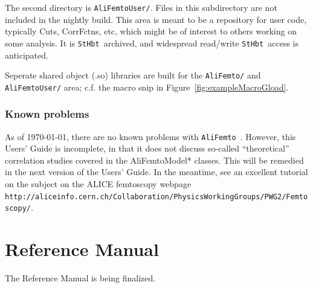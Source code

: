 \documentclass[twoside]{article}
\newcommand{\name}[1]{\textsf{#1}}%
\newcommand{\AliFemto}{{\tt AliFemto }}
\newcommand{\cvs}{{\tt StHbt }}
\begin{document}
The second directory is {\tt AliFemtoUser/}.  Files in this subdirectory are not included in the nightly
build.  This area is meant to be a repository for user code, typically Cuts, CorrFctns, etc, which might
be of interest to others working on some analysis.  It is \cvs archived, and widespread read/write \cvs access
is anticipated.

Seperate shared object (.so) libraries are built for the {\tt AliFemto/} and {\tt AliFemtoUser/}
area; c.f. the macro snip in Figure~\ref{fig:exampleMacroGload}.


\section{Known problems}

As of \today, there are no known problems with \AliFemto.  However, this Users' Guide is incomplete, in that
it does not discuss so-called ``theoretical'' correlation studies covered in the \name{AliFemtoModel*} classes.
This will be remedied in the next version of the Users' Guide.  In the meantime, see an excellent tutorial
on the subject on the ALICE femtoscopy webpage\\
 {\tt http://aliceinfo.cern.ch/Collaboration/PhysicsWorkingGroups/PWG2/Femtoscopy/}.



\clearpage

\part{Reference Manual}
\label{part:RefMan}

The Reference Manual is being finalized.

\clearpage
\end{document}
